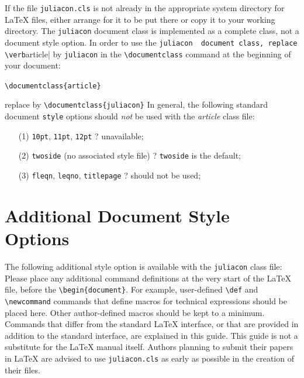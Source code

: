 \documentclass{juliacon}
\begin{document}
If the file \verb|juliacon.cls|  is not already in the appropriate system directory
for \LaTeX{} files, either arrange for it to be put there or copy
it to your working directory. The \verb|juliacon|  document class is implemented
as a complete class, not a document style option. In order to
use the \verb|juliacon  document class, replace \verb|article|  by \verb|juliacon|  in the
\verb|\documentclass|  command at the beginning of your document:
\vskip 6pt
\begin{centering}
    \verb|\documentclass{article}|  \end{centering}
\vskip 6pt
replace by
\vskip 6pt
 \verb|\documentclass{juliacon}|  \vskip 6pt
In general, the following standard document \verb|style|  options should
{ \itshape not} be used with the {\footnotesize \itshape article} class file:
\begin{enumerate}
\item[(1)] \verb|10pt|,  \verb|11pt|,  \verb|12pt|   ? unavailable;
\item[(2)] \verb|twoside|  (no associated style file) ? \verb|twoside|  is the default;
\item[(3)] \verb|fleqn|, \verb|leqno|, \verb|titlepage| ? should not be used;
\end{enumerate}

\section{Additional Document Style Options}
\label{sec:additional_doc}
%
The following additional style option is available with the \verb|juliacon|  class file:
\vskip 6pt
Please place any additional command definitions at the very start of
the \LaTeX{} file, before the \verb|\begin{document}|. For example, user-defined
\verb|\def|  and \verb|\newcommand|   commands that define macros for
technical expressions should be placed here. Other author-defined
macros should be kept to a minimum.
\vskip 6pt
Commands that differ from the standard \LaTeX{} interface, or that
are provided in addition to the standard interface, are explained in
this guide. This guide is not a substitute for the \LaTeX{} manual itself.
Authors planning to submit their papers in \LaTeX{} are advised to use
\verb|juliacon.cls|  as early as possible in the creation of their files.
\end{document}
